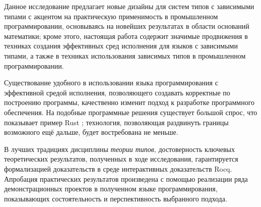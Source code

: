 
Данное исследование предлагает новые дизайны для систем
типов с зависимыми типами с акцентом на практическую
применимость в промышленном программировании, основываясь
на новейших результатах в области оснований математики;
кроме этого, настоящая работа содержит значимые
продвижения в техниках создания эффективных сред
исполнения для языков с зависимыми типами, а также в
техниках использования зависимых типов в промышленном
программировании.


Существование удобного в использовании языка
программирования с эффективной средой исполнения,
позволяющего создавать корректные по построению программы,
качественно изменит подход к разработке программного
обеспечения. На подобные программные решения существует
большой спрос, что показывает пример Rust
\cite{nsa2023rust}; технология, позволяющая раздвинуть
границы возможного ещё дальше, будет востребована не
меньше.


В лучших традициях дисциплины \textit{теории типов},
достоверность ключевых теоретических результатов,
полученных в ходе исследования, гарантируется
формализацией доказательств в среде интерактивных
доказательств Rocq. Апробация практических результатов
произведена с помощью реализации ряда демонстрационных
проектов в полученном языке программирования,
показывающих состоятельность и перспективность выбранного
подхода.
